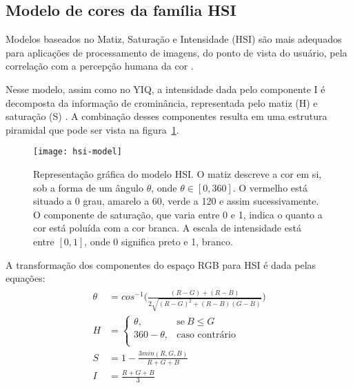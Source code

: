 \subsection{Modelo de cores da família HSI}
\label{sec:modelo_cores_hsi}

Modelos baseados no Matiz, Saturação e Intensidade (HSI) são mais adequados para aplicações de processamento de imagens, do ponto de vista do usuário, pela correlação com a percepção humana da cor \citep{konstantinos:00}.

Nesse modelo, assim como no YIQ, a intensidade dada pelo componente I é decomposta da informação de crominância, representada pelo matiz (H) e saturação (S) \citep{konstantinos:00}. A combinação desses componentes resulta em uma estrutura piramidal que pode ser vista na figura~\ref{fig:hsi-model}.

\begin{figure}[!h]
  \centering
  \texttt{[image: hsi-model]}
  \caption[Representação gráfica do modelo HSI]{Representação gráfica do modelo HSI. O matiz descreve a cor em si, sob a forma de um ângulo $\theta$, onde $\theta \in [0, 360]$. O vermelho está situado a 0 grau, amarelo a 60, verde a 120 e assim sucessivamente. O componente de saturação, que varia entre 0 e 1, indica o quanto a cor está poluída com a cor branca. A escala de intensidade está entre $[0, 1]$, onde 0 significa preto e 1, branco.}
  \label{fig:hsi-model} 
\end{figure}

A transformação dos componentes do espaço RGB para HSI é dada pelas equações:
\begin{align}
\label{eq:rgb_para_hsi}
\begin{split}
  \theta &= cos^{-1} \bigg( \frac{(R - G) + (R - B)}{2 \sqrt{(R - G)^2 + (R - B)(G - B)}} \bigg)
  \\[0.5em]
  H &= \begin{cases}
            \theta,       & \text{se}\ B \leq G\\
            360 - \theta, & \text{caso contrário}\\
       \end{cases}
  \\[0.5em]
  S &= 1 - \frac{3 min(R, G, B)}{R + G + B}
  \\[0.5em]
  I &= \frac{R + G + B}{3}
\end{split}
\end{align}

